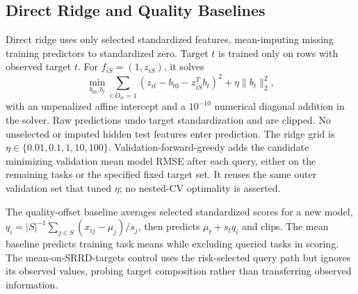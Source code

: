 \documentclass{article}
\begin{document}
\subsection{Direct Ridge and Quality Baselines}
Direct ridge uses only selected standardized features, mean-imputing missing training predictors to standardized zero. Target $t$ is trained only on rows with observed target $t$. For $f_{iS}=(1,z_{iS})$, it solves
\begin{equation}
\min_{b_{t0},b_t}\sum_{i:O_{it}=1}(z_{it}-b_{t0}-z_{iS}^Tb_t)^2+\eta\|b_t\|_2^2,
\end{equation}
with an unpenalized affine intercept and a $10^{-10}$ numerical diagonal addition in the solver. Raw predictions undo target standardization and are clipped. No unselected or imputed hidden test features enter prediction. The ridge grid is $\eta\in\{0.01,0.1,1,10,100\}$. Validation-forward-greedy adds the candidate minimizing validation mean model RMSE after each query, either on the remaining tasks or the specified fixed target set. It reuses the same outer validation set that tuned $\eta$; no nested-CV optimality is asserted.

The quality-offset baseline averages selected standardized scores for a new model, $q_i=|S|^{-1}\sum_{j\in S}(x_{ij}-\mu_j)/s_j$, then predicts $\mu_t+s_tq_i$ and clips. The mean baseline predicts training task means while excluding queried tasks in scoring. The mean-on-SRRD-targets control uses the risk-selected query path but ignores its observed values, probing target composition rather than transferring observed information.
\end{document}
